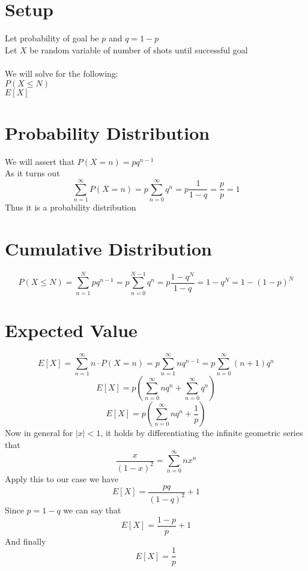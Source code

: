 \documentclass[twoside,11pt]{article}
\theoremstyle{definition}
\begin{document}
\section{Setup}

Let probability of goal be $p$ and $q=1-p$\\
Let $X$ be random variable of number of shots until successful goal\\
\\
We will solve for the following:\\
$P(X \leq N)$\\
$E[X]$

\section{Probability Distribution}

We will assert that $P(X=n)=p q^{n-1}$\\
As it turns out 
\[
\sum_{n=1}^{\infty} P(X=n) = p \sum_{n=0}^{\infty} q^n = p \frac{1}{1-q} = \frac{p}{p} = 1
\]
Thus it is a probability distribution

\section{Cumulative Distribution}

\[
P(X \leq N) = \sum_{n=1}^{N} p q^{n-1} = p \sum_{n=0}^{N-1} q^{n} = p \frac{1-q^N}{1-q} = 1 - q^N = 1 - (1-p)^N
\]

\section{Expected Value}

\[
E[X] = \sum_{n=1}^{\infty} n \cdot P(X=n) = p \sum_{n=1}^{\infty} n q^{n-1}=  p \sum_{n=0}^{\infty} (n+1) q^n
\]
\[
E[X] = p (\sum_{n=0}^{\infty} n q^n +  \sum_{n=0}^{\infty} q^n)
\]
\[
E[X] = p (\sum_{n=0}^{\infty} n q^n +  \frac{1}{p})
\]
Now in general for $|x|<1$, it holds by differentiating the infinite geometric series that 
\[
\frac{x}{(1-x)^2} = \sum_{n=0}^{\infty} n x^n
\]
Apply this to our case we have
\[
E[X] = \frac{pq}{(1-q)^2} + 1
\]
Since $p=1-q$ we can say that
\[
E[X] = \frac{1-p}{p} + 1
\]
And finally
\[
E[X] = \frac{1}{p}
\]
\end{document}
